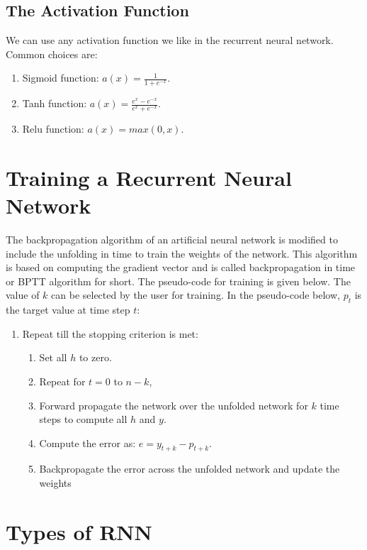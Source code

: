 \documentclass[10pt,a4paper]{article}
\begin{document}
\subsection{The Activation Function}
We can use any activation function we like in the recurrent neural network. Common choices are:
\begin{enumerate}
\item Sigmoid function: $a(x) = \frac{1}{1 + e^{-x}}$.

\item Tanh function: $a(x) = \frac{e^{x} - e^{-x}}{e^{x} + e^{-x}}$.

\item Relu function: $a(x) = max(0, x)$.
\end{enumerate}

\section{Training a Recurrent Neural Network}

	The backpropagation algorithm of an artificial neural network is modified to include the unfolding in time to train the weights of the network. This algorithm is based on computing the gradient vector and is called backpropagation in time or BPTT algorithm for short. The pseudo-code for training is given below. The value of $k$ can be selected by the user for training. In the pseudo-code below, $p_{t}$ is the target value at time step $t$:
	
\begin{enumerate}
	\item Repeat till the stopping criterion is met:
	\begin{enumerate}
		\item Set all $h$ to zero.
		\item Repeat for $t = 0$ to $n-k$,
		\item Forward propagate the network over the unfolded network for $k$ time steps to compute all $h$ and $y$. 
		\item Compute the error as: $e = y_{t+k} - p_{t+k}$.
		\item Backpropagate the error across the unfolded network and update the weights
	\end{enumerate}

\end{enumerate}	
	
\section{Types of RNN}
\end{document}
